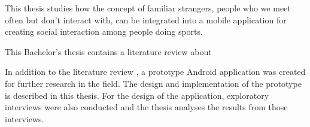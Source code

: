 %
%

\begin{enabstract}

This thesis studies how the concept of familiar strangers, people who we meet often but don't interact with, can be integrated into a mobile application for creating social interaction among people doing sports.

This Bachelor's thesis contains a literature review about 

In addition to the literature review , a prototype Android application was created for further research in the field. The design and implementation of the prototype is described in this thesis. For the design of the application, exploratory interviews were also conducted and the thesis analyses the results from those interviews.

\end{enabstract}



